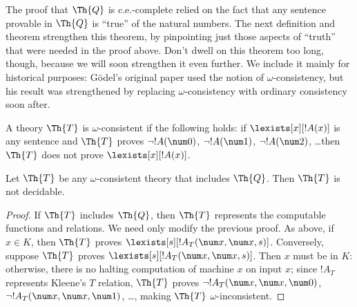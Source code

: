 \documentclass[../../../include/open-logic-section]{subfiles}
\begin{document}


\begin{explain}
The proof that $\Th{Q}$ is c.e.-complete relied on the fact that any
sentence provable in $\Th{Q}$ is ``true'' of the natural numbers. The
next definition and theorem strengthen this theorem, by pinpointing
just those aspects of ``truth'' that were needed in the proof
above. Don't dwell on this theorem too long, though, because we will
soon strengthen it even further. We include it mainly for
historical purposes: G\"odel's original paper used the notion of
$\omega$-consistency, but his result was strengthened by replacing
$\omega$-consistency with ordinary consistency soon after.
\end{explain}

\begin{defn}
A theory $\Th{T}$ is $\omega$-consistent if the following holds: if
$\lexists[x][!A(x)]$ is any sentence and $\Th{T}$ proves $\lnot
!A(\num 0)$, $\lnot !A(\num 1)$, $\lnot !A(\num 2)$, \dots then $\Th{T}$
does not prove $\lexists[x][!A(x)]$.
\end{defn}

\begin{thm}
  Let $\Th{T}$ be any $\omega$-consistent theory that includes $\Th{Q}$. Then
  $\Th{T}$ is not decidable.
\end{thm}

\begin{proof}
If $\Th{T}$ includes $\Th{Q}$, then $\Th{T}$ represents the computable
functions and relations. We need only modify the previous proof. As
above, if $x \in K$, then $\Th{T}$ proves $\lexists[s][!A_T(\num
  x,\num x, s)]$. Conversely, suppose $\Th{T}$ proves
$\lexists[s][!A_T(\num x, \num x, s)]$. Then $x$ must be in $K$:
otherwise, there is no halting computation of machine $x$ on input
$x$; since $!A_T$ represents Kleene's $T$ relation, $\Th{T}$
proves $\lnot !A_T(\num x, \num x, \num 0)$, $\lnot !A_T(\num x, \num
x, \num 1)$, \dots, making $\Th{T}$ $\omega$-inconsistent. 
\end{proof}
\end{document}
